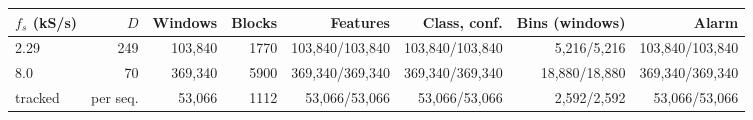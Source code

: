 \begin{tabular}{@{}lrrrrrrr@{}}
\toprule
$f_s$ (kS/s) & $D$ & Windows & Blocks & Features & Class, conf. & Bins (windows) & Alarm \\
\midrule
2.29 & 249 & 103,840 & 1770 & 103,840/103,840 & 103,840/103,840 & 5,216/5,216 & 103,840/103,840 \\
8.0 & 70 & 369,340 & 5900 & 369,340/369,340 & 369,340/369,340 & 18,880/18,880 & 369,340/369,340 \\
tracked & per seq. & 53,066 & 1112 & 53,066/53,066 & 53,066/53,066 & 2,592/2,592 & 53,066/53,066 \\
\bottomrule
\end{tabular}
